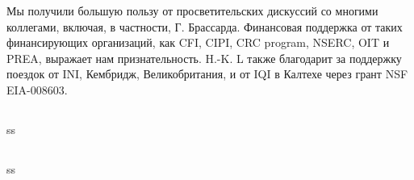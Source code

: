 Мы получили большую пользу от просветительских дискуссий со многими коллегами, включая, в частности, Г. Брассарда. Финансовая поддержка от таких финансирующих организаций, как CFI, CIPI, CRC program, NSERC, OIT и PREA, выражает нам признательность. H.-K. L также благодарит за поддержку поездок от INI, Кембридж, Великобритания, и от IQI в Калтехе через грант NSF EIA-008603.

\subsection{\review}
ss
\subsection{\dic}
ss